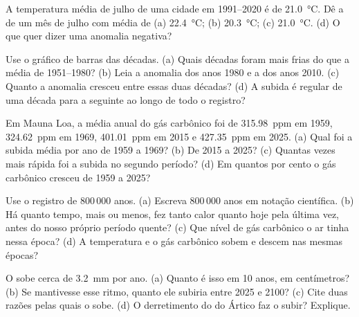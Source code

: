\begin{exercise}[$\star$]\label{exo:g9:climate-past-and-present:4}
A temperatura média de julho de uma cidade em 1991--2020 é de
\qty{21.0}{\degreeCelsius}. Dê a  de um mês de
julho com média de (a) \qty{22.4}{\degreeCelsius}; (b)
\qty{20.3}{\degreeCelsius}; (c) \qty{21.0}{\degreeCelsius}. (d) O que
quer dizer uma anomalia negativa?
\end{exercise}

\begin{exercise}[$\star\star$]\label{exo:g9:climate-past-and-present:5}
Use o gráfico de barras das décadas. (a) Quais décadas foram mais frias
do que a média de 1951--1980? (b) Leia a anomalia dos anos 1980 e a dos
anos 2010. (c) Quanto a anomalia cresceu entre essas duas décadas? (d) A
subida é regular de uma década para a seguinte ao longo de todo o
registro?
\end{exercise}

\begin{exercise}[$\star\star$]\label{exo:g9:climate-past-and-present:6}
Em Mauna Loa, a média anual do gás carbônico foi de \qty{315.98}{ppm} em
1959, \qty{324.62}{ppm} em 1969, \qty{401.01}{ppm} em 2015 e \qty{427.35}{ppm} em 2025. (a) Qual foi a
subida média por ano de 1959 a 1969? (b) De 2015 a 2025? (c) Quantas
vezes mais rápida foi a subida no segundo período? (d) Em quantos por
cento o gás carbônico cresceu de 1959 a 2025?
\end{exercise}

\begin{exercise}[$\star\star$]\label{exo:g9:climate-past-and-present:7}
Use o registro de 800\,000 anos. (a) Escreva 800\,000 anos em notação
científica. (b) Há quanto tempo, mais ou menos, fez tanto calor quanto
hoje pela última vez, antes do nosso próprio período quente? (c) Que
nível de gás carbônico o ar tinha nessa época? (d) A temperatura e o gás
carbônico sobem e descem nas mesmas épocas?
\end{exercise}

\begin{exercise}[$\star\star$]\label{exo:g9:climate-past-and-present:8}
O  sobe cerca de \qty{3.2}{mm} por ano. (a) Quanto é isso em 10 anos,
em centímetros? (b) Se mantivesse esse ritmo, quanto ele subiria entre
2025 e 2100? (c) Cite duas razões pelas quais o  sobe. (d) O
derretimento do  do Ártico faz o  subir? Explique.
\end{exercise}

